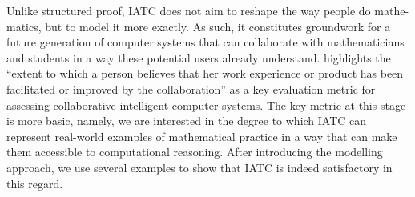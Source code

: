 \documentclass[smallextended,oneside]{svjour3}       %
\newcounter{turn}
\let\cite\citep
\newcommand\nothing[1]{#1}
\let\thesis\nothing
\let\paragraph\nothing
\begin{document}
Unlike structured proof, IATC does not aim to reshape the way people do mathe- matics, but to model it more exactly. As such, it constitutes groundwork for a future generation of computer systems that can collaborate with mathematicians and students in a way these potential users already understand. \citet{epstein2015wanted} highlights the ``extent to which a person believes that her work experience or product has been facilitated or improved by the collaboration'' as a key evaluation metric for assessing collaborative intelligent computer systems. The key metric at this stage is more basic, namely, we are interested in the degree to which IATC can represent real-world examples of mathematical practice in a way that can make them accessible to computational reasoning. After introducing the modelling approach, we use several examples to show that IATC is indeed satisfactory in this regard.


\end{document}
